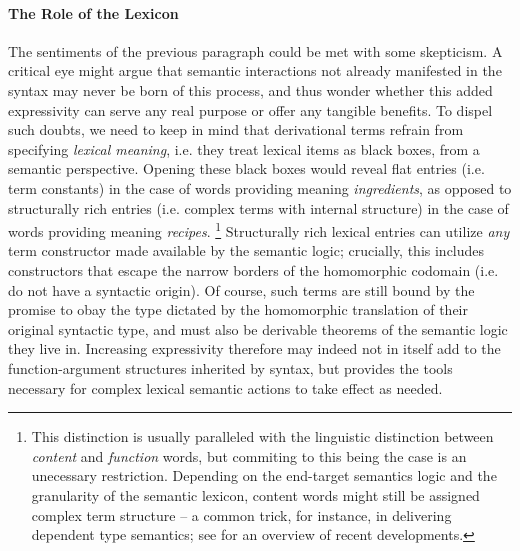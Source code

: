 \paragraph{The Role of the Lexicon}
The sentiments of the previous paragraph could be met with some skepticism.
A critical eye might argue that semantic interactions not already manifested in the syntax may never be born of this process, and thus wonder whether this added expressivity can serve any real purpose or offer any tangible benefits.
To dispel such doubts, we need to keep in mind that derivational terms refrain from specifying \textit{lexical meaning}, i.e. they treat lexical items as black boxes, from a semantic perspective.
Opening these black boxes would reveal flat entries (i.e. term constants) in the case of words providing meaning \textit{ingredients}, as opposed to structurally rich entries (i.e. complex terms with internal structure) in the case of words providing meaning \textit{recipes}.%
\footnote{This distinction is usually paralleled with the linguistic distinction between \textit{content} and \textit{function} words, but commiting to this being the case is an unecessary restriction. Depending on the end-target semantics logic and the granularity of the semantic lexicon, content words might still be assigned complex term structure -- a common trick, for instance, in delivering dependent type semantics; see \citet{chatzikyriakidis2020formal} for an overview of recent developments.}
Structurally rich lexical entries can utilize \textit{any} term constructor made available by the semantic logic; crucially, this includes constructors that escape the narrow borders of the homomorphic codomain (i.e. do not have a syntactic origin).
Of course, such terms are still bound by the promise to obay the type dictated by the homomorphic translation of their original syntactic type, and must also be derivable theorems of the semantic logic they live in.
Increasing expressivity therefore may indeed not in itself add to the function-argument structures inherited by syntax, but provides the tools necessary for complex lexical semantic actions to take effect as needed.

